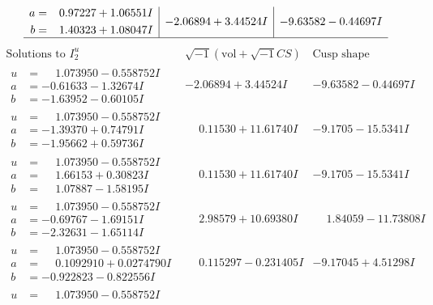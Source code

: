 \documentclass[1p]{elsarticle_modified}
\theoremstyle{definition}
\newcommand{\I}{\sqrt{-1}}
\begin{document}
$$\begin{array}{c|c|c}
\begin{aligned}
a &= \phantom{-}0.97227 + 1.06551 I \\
b &= \phantom{-}1.40323 + 1.08047 I\end{aligned}
 & -2.06894 + 3.44524 I & -9.63582 - 0.44697 I\\
 \hline 
 \end{array}$$\newpage$$\begin{array}{c|c|c}  
\text{Solutions to }I^u_{2}& \I (\text{vol} + \sqrt{-1}CS) & \text{Cusp shape}\\
 \hline 
\begin{aligned}
u &= \phantom{-}1.073950 - 0.558752 I \\
a &= -0.61633 - 1.32674 I \\
b &= -1.63952 - 0.60105 I\end{aligned}
 & -2.06894 + 3.44524 I & -9.63582 - 0.44697 I \\ \hline\begin{aligned}
u &= \phantom{-}1.073950 - 0.558752 I \\
a &= -1.39370 + 0.74791 I \\
b &= -1.95662 + 0.59736 I\end{aligned}
 & \phantom{-}0.11530 + 11.61740 I & -9.1705 - 15.5341 I \\ \hline\begin{aligned}
u &= \phantom{-}1.073950 - 0.558752 I \\
a &= \phantom{-}1.66153 + 0.30823 I \\
b &= \phantom{-}1.07887 - 1.58195 I\end{aligned}
 & \phantom{-}0.11530 + 11.61740 I & -9.1705 - 15.5341 I \\ \hline\begin{aligned}
u &= \phantom{-}1.073950 - 0.558752 I \\
a &= -0.69767 - 1.69151 I \\
b &= -2.32631 - 1.65114 I\end{aligned}
 & \phantom{-}2.98579 + 10.69380 I & \phantom{-}1.84059 - 11.73808 I \\ \hline\begin{aligned}
u &= \phantom{-}1.073950 - 0.558752 I \\
a &= \phantom{-}0.1092910 + 0.0274790 I \\
b &= -0.922823 - 0.822556 I\end{aligned}
 & \phantom{-}0.115297 - 0.231405 I & -9.17045 + 4.51298 I \\ \hline\begin{aligned}
u &= \phantom{-}1.073950 - 0.558752 I \\

\end{aligned}
\end{array}$$
\end{document}
